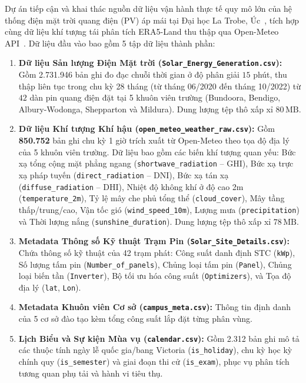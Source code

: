 \documentclass[12pt, a4paper]{report}
\begin{document}
Dự án tiếp cận và khai thác nguồn dữ liệu vận hành thực tế quy mô lớn của hệ thống điện mặt trời quang điện (PV) áp mái tại Đại học La Trobe, Úc~\cite{wimalaratne2022unisolar}, tích hợp cùng dữ liệu khí tượng tái phân tích ERA5-Land thu thập qua Open-Meteo API~\cite{openmeteo2023}. Dữ liệu đầu vào bao gồm 5 tập dữ liệu thành phần:

\begin{enumerate}[label=\arabic*., leftmargin=*]
    \item \textbf{Dữ liệu Sản lượng Điện Mặt trời (\texttt{Solar\_Energy\_Generation.csv}):} Gồm 2.731.946 bản ghi đo đạc chuỗi thời gian ở độ phân giải $15$ phút, thu thập liên tục trong chu kỳ 28 tháng (từ tháng 06/2020 đến tháng 10/2022) từ $42$ dàn pin quang điện đặt tại 5 khuôn viên trường (Bundoora, Bendigo, Albury-Wodonga, Shepparton và Mildura). Dung lượng tệp thô xấp xỉ $80\,\text{MB}$.
    
    \item \textbf{Dữ liệu Khí tượng Khí hậu (\texttt{open\_meteo\_weather\_raw.csv}):} Gồm \textbf{850.752} bản ghi chu kỳ 1 giờ trích xuất từ Open-Meteo theo tọa độ địa lý của 5 khuôn viên trường. Dữ liệu bao gồm các biến khí tượng quan yếu: Bức xạ tổng cộng mặt phẳng ngang (\texttt{shortwave\_radiation} -- GHI), Bức xạ trực xạ pháp tuyến (\texttt{direct\_radiation} -- DNI), Bức xạ tán xạ (\texttt{diffuse\_radiation} -- DHI), Nhiệt độ không khí ở độ cao 2m (\texttt{temperature\_2m}), Tỷ lệ mây che phủ tổng thể (\texttt{cloud\_cover}), Mây tầng thấp/trung/cao, Vận tốc gió (\texttt{wind\_speed\_10m}), Lượng mưa (\texttt{precipitation}) và Thời lượng nắng (\texttt{sunshine\_duration}). Dung lượng tệp thô xấp xỉ $78\,\text{MB}$.
    
    \item \textbf{Metadata Thông số Kỹ thuật Trạm Pin (\texttt{Solar\_Site\_Details.csv}):} Chứa thông số kỹ thuật của 42 trạm phát: Công suất danh định STC (\texttt{kWp}), Số lượng tấm pin (\texttt{Number\_of\_panels}), Chủng loại tấm pin (\texttt{Panel}), Chủng loại biến tần (\texttt{Inverter}), Bộ tối ưu hóa công suất (\texttt{Optimizers}), và Tọa độ địa lý (\texttt{lat}, \texttt{Lon}).
    
    \item \textbf{Metadata Khuôn viên Cơ sở (\texttt{campus\_meta.csv}):} Thông tin định danh của 5 cơ sở đào tạo kèm tổng công suất lắp đặt từng phân vùng.
    
    \item \textbf{Lịch Biểu và Sự kiện Mùa vụ (\texttt{calendar.csv}):} Gồm 2.312 bản ghi mô tả các thuộc tính ngày lễ quốc gia/bang Victoria (\texttt{is\_holiday}), chu kỳ học kỳ chính quy (\texttt{is\_semester}) và giai đoạn thi cử (\texttt{is\_exam}), phục vụ phân tích tương quan phụ tải và hành vi tiêu thụ.
\end{enumerate}
\end{document}
